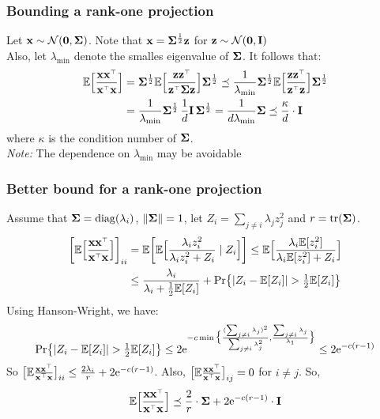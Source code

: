 \documentclass[10pt]{beamer}
\begin{document}
\begin{frame}
  \frametitle{Bounding a rank-one projection}
  Let $\mathbf x\sim\mathcal{N}(\mathbf 0,\mathbf{\Sigma})$. Note that $\mathbf x=\mathbf{\Sigma}^{\frac12}\mathbf z$
  for $\mathbf z\sim\mathcal{N}(\mathbf 0,\mathbf I)$\\
  Also, let $\lambda_{\min}$ denote the smalles eigenvalue of
  $\mathbf{\Sigma}$. It follows that:
  \begin{align*}
    \E\Big[\frac{\x\x^\top}{\x^\top\x}\Big]
&= \Sigmab^{\frac12}\E\Big[\frac{\z\z^\top}{\z^\top\Sigmab\z}\Big]\Sigmab^{\frac12}
\preceq \frac1{\lambda_{\min}}\Sigmab^{\frac12}\E\Big[\frac{\z\z^\top}{\z^\top\z}\Big]\Sigmab^{\frac12} 
  \\ &  =\frac{1}{\lambda_{\min}}\Sigmab^{\frac12}\,\frac1d\I\,\Sigmab^{\frac12}
  =\frac1{d\lambda_{\min}}\Sigmab \preceq \frac{\kappa}{d}\cdot \I
  \end{align*}
  where $\kappa$ is the condition number of $\mathbf{\Sigma}$.\\[5mm]
  
\textit{Note:} The dependence on $\lambda_{\min}$ may be avoidable
\end{frame}

\begin{frame}
  \frametitle{Better bound for a rank-one projection}
Assume that $\mathbf{\Sigma}=\operatorname*{\mathop{\mathrm{diag}}}(\lambda_{i})$,
  $\|\mathbf{\Sigma}\|=1$, let $Z_i=\sum_{j\neq i}\lambda_jz_j^2$ and $r=\mathrm{tr}(\mathbf{\Sigma})$.
  \begin{align*}
    \bigg[\E\Big[\frac{\x\x^\top}{\x^\top\x}\Big]\bigg]_{ii}
    &=\E\bigg[\E\Big[\frac{\lambda_iz_i^2}{\lambda_iz_i^2+Z_i}\mid Z_i\Big]\bigg]
   \leq
      \E\Big[\frac{\lambda_i\E[z_i^2]}{\lambda_i\E[z_i^2]+Z_i}\Big]\\
    &\leq \frac{\lambda_i}{\lambda_i+\frac12\E[Z_i]} + \Pr\big\{|Z_i-\E[Z_i]|>\tfrac12\E[Z_i]\big\}
  \end{align*}
  Using Hanson-Wright, we have:
  \begin{align*}
    \Pr\big\{|Z_i-\E[Z_i]|>\tfrac12\E[Z_i]\big\}\leq
    2\ee^{-c\min\big\{\frac{(\sum_{j\neq i}\lambda_j)^2}{\sum_{j\neq
    i}\lambda_j^2},\frac{\sum_{j\neq
    i}\lambda_j}{\lambda_1}\big\}} \leq 2\ee^{-c(r-1)}
  \end{align*}
  So  $\big[\E\frac{\x\x^\top}{\x^\top\x}\big]_{ii}\leq
  \frac{2\lambda_i}{r}+2\ee^{-c(r-1)}$. Also, 
  $\big[\E\frac{\x\x^\top}{\x^\top\x}\big]_{ij}=0$ for $i\neq j$. So,
  \begin{align*}
    \E\Big[\frac{\x\x^\top}{\x^\top\x}\Big]\preceq
    \frac2{r}\cdot\Sigmab + 2\ee^{-c(r-1)}\cdot \I
  \end{align*}
\end{frame}
\end{document}

